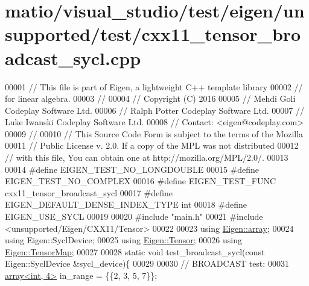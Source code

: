 \hypertarget{matio_2visual__studio_2test_2eigen_2unsupported_2test_2cxx11__tensor__broadcast__sycl_8cpp_source}{}\section{matio/visual\+\_\+studio/test/eigen/unsupported/test/cxx11\+\_\+tensor\+\_\+broadcast\+\_\+sycl.cpp}
\label{matio_2visual__studio_2test_2eigen_2unsupported_2test_2cxx11__tensor__broadcast__sycl_8cpp_source}

\begin{DoxyCode}
00001 \textcolor{comment}{// This file is part of Eigen, a lightweight C++ template library}
00002 \textcolor{comment}{// for linear algebra.}
00003 \textcolor{comment}{//}
00004 \textcolor{comment}{// Copyright (C) 2016}
00005 \textcolor{comment}{// Mehdi Goli    Codeplay Software Ltd.}
00006 \textcolor{comment}{// Ralph Potter  Codeplay Software Ltd.}
00007 \textcolor{comment}{// Luke Iwanski  Codeplay Software Ltd.}
00008 \textcolor{comment}{// Contact: <eigen@codeplay.com>}
00009 \textcolor{comment}{//}
00010 \textcolor{comment}{// This Source Code Form is subject to the terms of the Mozilla}
00011 \textcolor{comment}{// Public License v. 2.0. If a copy of the MPL was not distributed}
00012 \textcolor{comment}{// with this file, You can obtain one at http://mozilla.org/MPL/2.0/.}
00013 
00014 \textcolor{preprocessor}{#define EIGEN\_TEST\_NO\_LONGDOUBLE}
00015 \textcolor{preprocessor}{#define EIGEN\_TEST\_NO\_COMPLEX}
00016 \textcolor{preprocessor}{#define EIGEN\_TEST\_FUNC cxx11\_tensor\_broadcast\_sycl}
00017 \textcolor{preprocessor}{#define EIGEN\_DEFAULT\_DENSE\_INDEX\_TYPE int}
00018 \textcolor{preprocessor}{#define EIGEN\_USE\_SYCL}
00019 
00020 \textcolor{preprocessor}{#include "main.h"}
00021 \textcolor{preprocessor}{#include <unsupported/Eigen/CXX11/Tensor>}
00022 
00023 \textcolor{keyword}{using} \hyperlink{class_eigen_1_1array}{Eigen::array};
00024 \textcolor{keyword}{using} Eigen::SyclDevice;
00025 \textcolor{keyword}{using} \hyperlink{class_eigen_1_1_tensor}{Eigen::Tensor};
00026 \textcolor{keyword}{using} \hyperlink{class_eigen_1_1_tensor_map}{Eigen::TensorMap};
00027 
00028 \textcolor{keyword}{static} \textcolor{keywordtype}{void} test\_broadcast\_sycl(\textcolor{keyword}{const} Eigen::SyclDevice &sycl\_device)\{
00029 
00030   \textcolor{comment}{// BROADCAST test:}
00031   \hyperlink{class_eigen_1_1array}{array<int, 4>} in\_range   = \{\{2, 3, 5, 7\}\};

\end{DoxyCode}

